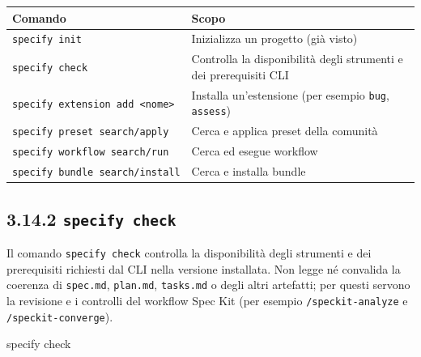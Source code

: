 \documentclass[
  italian,
  10pt,
]{book}
\newenvironment{Shaded}{\begin{snugshade}}{\end{snugshade}}
\newcommand{\ExtensionTok}[1]{#1}
\newcommand{\NormalTok}[1]{#1}
\newcounter{none} %
\begin{document}
{\def\LTcaptype{none} %
\begin{longtable}[]{@{}
  >{\raggedright\arraybackslash}p{}
  >{\raggedright\arraybackslash}p{}@{}}
\toprule\noalign{}
\begin{minipage}[b]{\linewidth}\raggedright
Comando
\end{minipage} & \begin{minipage}[b]{\linewidth}\raggedright
Scopo
\end{minipage} \\
\midrule\noalign{}
\endhead
\bottomrule\noalign{}
\endlastfoot
\texttt{specify\ init} & Inizializza un progetto (già visto) \\
\texttt{specify\ check} & Controlla la disponibilità degli strumenti e
dei prerequisiti CLI \\
\texttt{specify\ extension\ add\ \textless{}nome\textgreater{}} &
Installa un'estensione (per esempio \texttt{bug}, \texttt{assess}) \\
\texttt{specify\ preset\ search/apply} & Cerca e applica preset della
comunità \\
\texttt{specify\ workflow\ search/run} & Cerca ed esegue workflow \\
\texttt{specify\ bundle\ search/install} & Cerca e installa bundle \\
\end{longtable}
}

\subsection{\texorpdfstring{3.14.2
\texttt{specify\ check}}{3.14.2 specify check}}\label{specify-check}

Il comando \texttt{specify\ check} controlla la disponibilità degli
strumenti e dei prerequisiti richiesti dal CLI nella versione
installata. Non legge né convalida la coerenza di \texttt{spec.md},
\texttt{plan.md}, \texttt{tasks.md} o degli altri artefatti; per questi
servono la revisione e i controlli del workflow Spec Kit (per esempio
\texttt{/speckit-analyze} e \texttt{/speckit-converge}).

\begin{Shaded}
\begin{Highlighting}[]
\ExtensionTok{specify}\NormalTok{ check}
\end{Highlighting}
\end{Shaded}
\end{document}

